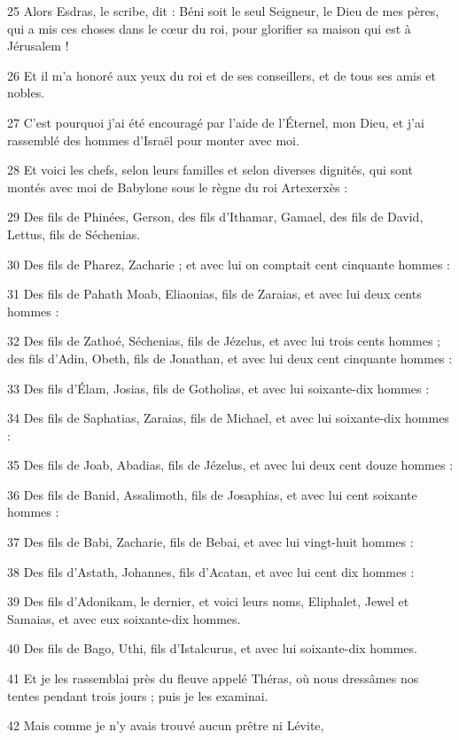 \par 25 Alors Esdras, le scribe, dit : Béni soit le seul Seigneur, le Dieu de mes pères, qui a mis ces choses dans le cœur du roi, pour glorifier sa maison qui est à Jérusalem !
\par 26 Et il m'a honoré aux yeux du roi et de ses conseillers, et de tous ses amis et nobles.
\par 27 C'est pourquoi j'ai été encouragé par l'aide de l'Éternel, mon Dieu, et j'ai rassemblé des hommes d'Israël pour monter avec moi.
\par 28 Et voici les chefs, selon leurs familles et selon diverses dignités, qui sont montés avec moi de Babylone sous le règne du roi Artexerxès :
\par 29 Des fils de Phinées, Gerson, des fils d'Ithamar, Gamael, des fils de David, Lettus, fils de Séchenias.
\par 30 Des fils de Pharez, Zacharie ; et avec lui on comptait cent cinquante hommes :
\par 31 Des fils de Pahath Moab, Eliaonias, fils de Zaraias, et avec lui deux cents hommes :
\par 32 Des fils de Zathoé, Séchenias, fils de Jézelus, et avec lui trois cents hommes ; des fils d'Adin, Obeth, fils de Jonathan, et avec lui deux cent cinquante hommes :
\par 33 Des fils d'Élam, Josias, fils de Gotholias, et avec lui soixante-dix hommes :
\par 34 Des fils de Saphatias, Zaraias, fils de Michael, et avec lui soixante-dix hommes :
\par 35 Des fils de Joab, Abadias, fils de Jézelus, et avec lui deux cent douze hommes :
\par 36 Des fils de Banid, Assalimoth, fils de Josaphias, et avec lui cent soixante hommes :
\par 37 Des fils de Babi, Zacharie, fils de Bebai, et avec lui vingt-huit hommes :
\par 38 Des fils d'Astath, Johannes, fils d'Acatan, et avec lui cent dix hommes :
\par 39 Des fils d'Adonikam, le dernier, et voici leurs noms, Eliphalet, Jewel et Samaias, et avec eux soixante-dix hommes.
\par 40 Des fils de Bago, Uthi, fils d'Istalcurus, et avec lui soixante-dix hommes.
\par 41 Et je les rassemblai près du fleuve appelé Théras, où nous dressâmes nos tentes pendant trois jours ; puis je les examinai.
\par 42 Mais comme je n'y avais trouvé aucun prêtre ni Lévite,
